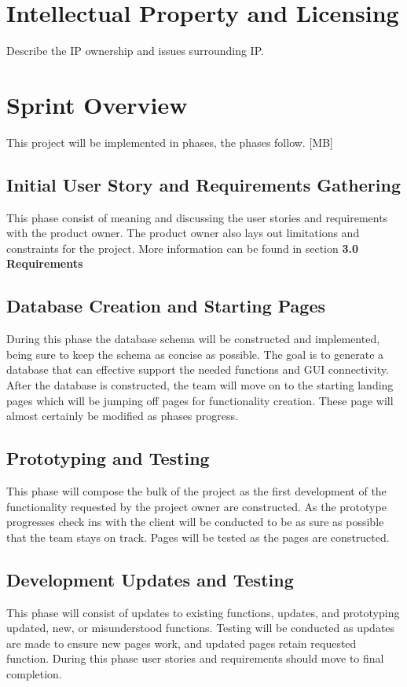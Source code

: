 \section{Intellectual Property and Licensing}
Describe the IP ownership and issues surrounding IP.

\section{Sprint  Overview}
This project will be implemented in phases, the phases follow. [MB]

\subsection{Initial User Story and Requirements Gathering}
This phase consist of meaning and discussing the user stories and requirements with the product owner. The product owner also lays out limitations and constraints for the project. More information can be found in section \bf 3.0 Requirements

\subsection{Database Creation and Starting Pages}
During this phase the database schema will be constructed and implemented, being sure to keep the schema as concise as possible. The goal is to generate a database that can effective support the needed functions and GUI connectivity. After the database is constructed, the team will move on to the starting landing pages which will be jumping off pages for functionality creation. These page will almost certainly be modified as phases progress.

\subsection{Prototyping and Testing}
This phase will compose the bulk of the project as the first development of the functionality requested by the project owner are constructed. As the prototype progresses check ins with the client will be conducted to be as sure as possible that the team stays on track. Pages will be tested as the pages are constructed.

\subsection{Development Updates and Testing}
This phase will consist of updates to existing functions, updates, and prototyping updated, new, or misunderstood functions. Testing will be conducted as updates are made to ensure new pages work, and updated pages retain requested function. During this phase user stories and requirements should move to final completion.

